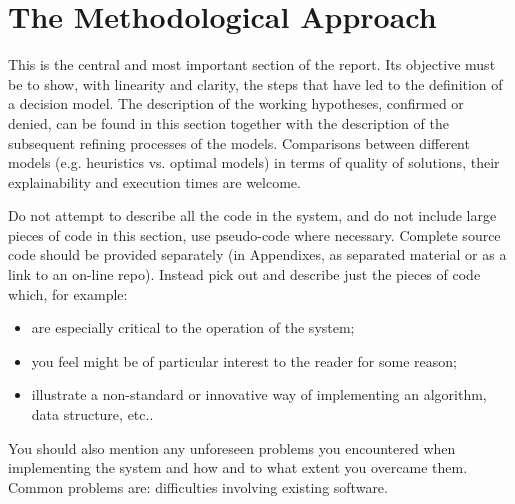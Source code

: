 \section{The Methodological Approach}

This is the central and most important section of the report.
Its objective must be to show, with linearity and clarity, the steps that have led to the definition of a decision model.
The description of the working hypotheses, confirmed or denied, can be found in this section together with the description of the subsequent refining processes of the models.
Comparisons between different models (e.g. heuristics vs. optimal models) in terms of quality of solutions, their explainability and execution times are welcome.

Do not attempt to describe all the code in the system, and do not include large pieces of code in this section, use pseudo-code where necessary.
Complete source code should be provided separately (in Appendixes, as separated material or as a link to an on-line repo).
Instead pick out and describe just the pieces of code which, for example:
\begin{itemize}
    \item are especially critical to the operation of the system;
    \item you feel might be of particular interest to the reader for some reason;
    \item illustrate a non-standard or innovative way of implementing an algorithm, data structure, etc..
\end{itemize}

You should also mention any unforeseen problems you encountered when implementing the
system and how and to what extent you overcame them. Common problems are:
difficulties involving existing software.
